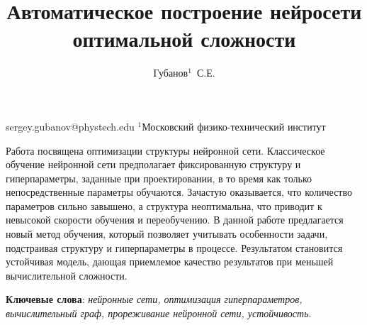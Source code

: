 \documentclass[12pt,twoside]{article}
\begin{document}
\title
    {Автоматическое построение нейросети оптимальной сложности}
\author
    {Губанов$^1$~С.Е.} %
\email
    {sergey.gubanov@phystech.edu}
\organization
    {$^1$Московский физико-технический институт}
\abstract
	{Работа посвящена оптимизации структуры нейронной сети. Классическое обучение нейронной сети предполагает фиксированную структуру и гиперпараметры, заданные при проектировании, в то время как только непосредственные параметры обучаются. Зачастую оказывается, что количество параметров сильно завышено, а структура неоптимальна, что приводит к невысокой скорости обучения и переобучению. В данной работе предлагается новый метод обучения, который позволяет учитывать особенности задачи, подстраивая структуру и гиперпараметры в процессе. Результатом становится устойчивая модель, дающая приемлемое качество результатов при меньшей вычислительной сложности.
		
\bigskip
\textbf{Ключевые слова}: \emph {нейронные сети, оптимизация гиперпараметров, вычислительный граф, прореживание нейронной сети, устойчивость}.

}



\end{document}
